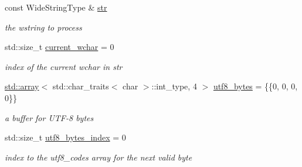 \begin{DoxyCompactItemize}
\item 
\mbox{\label{classnlohmann_1_1detail_1_1wide__string__input__adapter_a30fcb522f072d58eb0fb52cfb784e9c9}} 
const Wide\+String\+Type \& \mbox{\hyperlink{classnlohmann_1_1detail_1_1wide__string__input__adapter_a30fcb522f072d58eb0fb52cfb784e9c9}{str}}
\begin{DoxyCompactList}\small\item\em the wstring to process \end{DoxyCompactList}\item 
\mbox{\label{classnlohmann_1_1detail_1_1wide__string__input__adapter_a196fe1fb07310dc8c2ca3a0a9ef9b27a}} 
std\+::size\+\_\+t \mbox{\hyperlink{classnlohmann_1_1detail_1_1wide__string__input__adapter_a196fe1fb07310dc8c2ca3a0a9ef9b27a}{current\+\_\+wchar}} = 0
\begin{DoxyCompactList}\small\item\em index of the current wchar in str \end{DoxyCompactList}\item 
\mbox{\label{classnlohmann_1_1detail_1_1wide__string__input__adapter_af0854ae66725357d074912379a235128}} 
\mbox{\hyperlink{namespacenlohmann_1_1detail_a1ed8fc6239da25abcaf681d30ace4985af1f713c9e000f5d3f280adbd124df4f5}{std\+::array}}$<$ std\+::char\+\_\+traits$<$ char $>$\+::int\+\_\+type, 4 $>$ \mbox{\hyperlink{classnlohmann_1_1detail_1_1wide__string__input__adapter_af0854ae66725357d074912379a235128}{utf8\+\_\+bytes}} = \{\{0, 0, 0, 0\}\}
\begin{DoxyCompactList}\small\item\em a buffer for U\+T\+F-\/8 bytes \end{DoxyCompactList}\item 
\mbox{\label{classnlohmann_1_1detail_1_1wide__string__input__adapter_a6d87bc3e8b427e06cda936383283e0c4}} 
std\+::size\+\_\+t \mbox{\hyperlink{classnlohmann_1_1detail_1_1wide__string__input__adapter_a6d87bc3e8b427e06cda936383283e0c4}{utf8\+\_\+bytes\+\_\+index}} = 0
\begin{DoxyCompactList}\small\item\em index to the utf8\+\_\+codes array for the next valid byte \end{DoxyCompactList}\item 

\end{DoxyCompactItemize}
